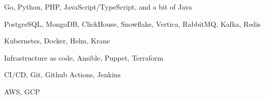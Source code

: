 \item Go, Python, PHP, JavaScript/TypeScript, and a bit of Java
\item PostgreSQL, MongoDB, ClickHouse, Snowflake, Vertica, RabbitMQ, Kafka,
  Redis
\item Kubernetes, Docker, Helm, Krane
\item Infrastructure as code, Ansible, Puppet, Terraform
\item CI/CD, Git, Github Actions, Jenkins
\item AWS, GCP
